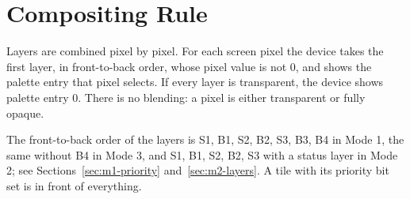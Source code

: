 \section{Compositing Rule}
\label{sec:compositing}

Layers are combined pixel by pixel. For each screen pixel the device takes the first layer, in front-to-back order,
whose pixel value is not 0, and shows the palette entry that pixel selects. If every layer is transparent, the device
shows palette entry 0. There is no blending: a pixel is either transparent or fully opaque.

The front-to-back order of the layers is S1, B1, S2, B2, S3, B3, B4 in Mode 1, the same without B4 in Mode 3, and S1,
B1, S2, B2, S3 with a status layer in Mode 2; see Sections~\ref{sec:m1-priority} and~\ref{sec:m2-layers}. A tile with
its priority bit set is in front of everything.
